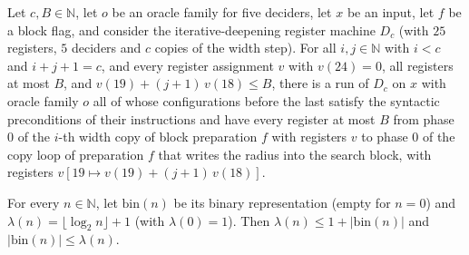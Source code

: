 \begin{theorem}
\label{Complexity.LogProg.SavitchARM.dp_cT_run}
\leanok
{}
Let $c,B\in\mathbb{N}$, let $o$ be an oracle family for five deciders, let $x$ be an input, let
$f$ be a block flag, and consider the iterative-deepening register machine $D_c$ (with $25$ registers, $5$ deciders and $c$ copies of the width step). For all $i,j\in\mathbb{N}$ with $i<c$ and $i+j+1=c$, and
every register assignment $v$ with $v(24)=0$, all registers at most $B$, and
$v(19)+(j+1)\,v(18)\le B$, there is a run of $D_c$ on $x$ with oracle family $o$ all of whose configurations before the last satisfy the syntactic preconditions of their instructions and have every register at most $B$ from phase $0$ of the $i$-th width copy of block
preparation $f$ with registers $v$ to phase $0$ of the copy loop of preparation $f$ that writes the
radius into the search block, with registers $v[19\mapsto v(19)+(j+1)\,v(18)]$.
\end{theorem}

\begin{theorem}
\label{Complexity.LogProg.SavitchARM.dp_bits_logSpace}
\leanok
{}
For every $n\in\mathbb{N}$, let $\mathrm{bin}(n)$ be its binary representation (empty for $n=0$) and
$\lambda(n)=\lfloor\log_2 n\rfloor+1$ (with $\lambda(0)=1$). Then
$\lambda(n)\le 1+|\mathrm{bin}(n)|$ and $|\mathrm{bin}(n)|\le\lambda(n)$.
\end{theorem}

